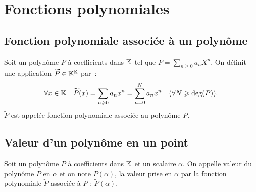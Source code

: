 \section{Fonctions polynomiales}

\subsection{Fonction polynomiale associée à un polynôme}

\begin{defdef}
  Soit un polynôme $P$ à coefficients dans $\mathbb{K}$ tel que $P=\sum_{n \geqslant 0}a_n X^n$. On définit une application $\widetilde{P} \in \mathbb{K}^{\mathbb{K}}$ par~:
  \begin{equation}
    \forall x \in \mathbb{K} \quad \widetilde{P}(x) = \sum_{n \geqslant 0} a_n x^n=\sum_{n=0}^N a_n x^n \quad (\forall N \geqslant \deg(P)).
  \end{equation}
  $\widetilde{P}$ est appelée fonction polynomiale associée au polynôme $P$.
\end{defdef}

\subsection{Valeur d'un polynôme en un point}

\begin{defdef}
  Soit un polynôme $P$ à coefficients dans $\mathbb{K}$ et un scalaire $\alpha$. On appelle valeur du polynôme $P$ en $\alpha$ et on note $P(\alpha)$, la valeur prise en $\alpha$ par la fonction polynomiale $\widetilde{P}$ associée à $P$ : $\widetilde{P}(\alpha)$.
\end{defdef}

